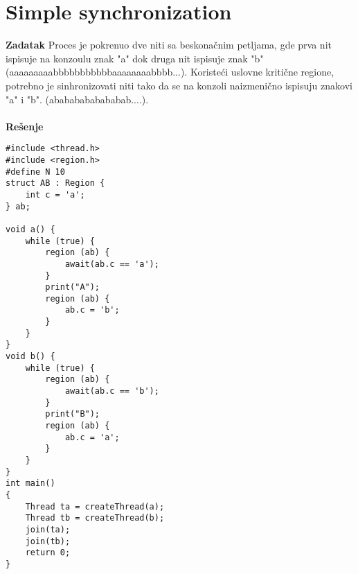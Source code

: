 \clearpage
\section{Simple synchronization}
\textbf{\large Zadatak} Proces je pokrenuo dve niti sa beskona\v{c}nim petljama, gde prva nit ispisuje na konzoulu znak "a" dok druga nit ispisuje znak "b" (aaaaaaaaabbbbbbbbbbbaaaaaaaabbbb...). Koriste\'{c}i uslovne kriti\v{c}ne regione, potrebno je sinhronizovati niti tako da se na konzoli naizmeni\v{c}no ispisuju znakovi "a" i "b". (abababababababab....).
\\\\
\textbf{\large Re\v{s}enje}
\begin{lstlisting}
#include <thread.h>
#include <region.h>
#define N 10
struct AB : Region {
    int c = 'a';
} ab;

void a() {
    while (true) {
        region (ab) {
            await(ab.c == 'a');
        }
        print("A");
        region (ab) {
            ab.c = 'b';
        }
    }
}
void b() {
    while (true) {
        region (ab) {
            await(ab.c == 'b');
        }
        print("B");
        region (ab) {
            ab.c = 'a';
        }
    }
}
int main() 
{
    Thread ta = createThread(a);
    Thread tb = createThread(b);
    join(ta);
    join(tb);
    return 0;
}
\end{lstlisting}